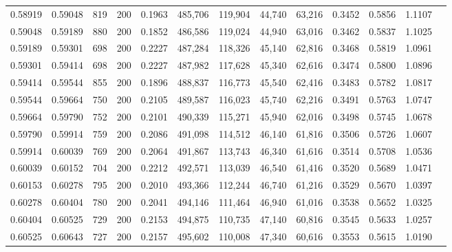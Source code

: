 \begin{tabular}{rrrrrrrrrrrrr}
0.58919 & 0.59048 &    819 & 200 &                                     0.1963 & 485,706 & 119,904 &  44,740 &  63,216 & 0.3452 & 0.5856 & 1.1107 \\
0.59048 & 0.59189 &    880 & 200 &                                     0.1852 & 486,586 & 119,024 &  44,940 &  63,016 & 0.3462 & 0.5837 & 1.1025 \\
0.59189 & 0.59301 &    698 & 200 &                                     0.2227 & 487,284 & 118,326 &  45,140 &  62,816 & 0.3468 & 0.5819 & 1.0961 \\
0.59301 & 0.59414 &    698 & 200 &                                     0.2227 & 487,982 & 117,628 &  45,340 &  62,616 & 0.3474 & 0.5800 & 1.0896 \\
0.59414 & 0.59544 &    855 & 200 &                                     0.1896 & 488,837 & 116,773 &  45,540 &  62,416 & 0.3483 & 0.5782 & 1.0817 \\
0.59544 & 0.59664 &    750 & 200 &                                     0.2105 & 489,587 & 116,023 &  45,740 &  62,216 & 0.3491 & 0.5763 & 1.0747 \\
0.59664 & 0.59790 &    752 & 200 &                                     0.2101 & 490,339 & 115,271 &  45,940 &  62,016 & 0.3498 & 0.5745 & 1.0678 \\
0.59790 & 0.59914 &    759 & 200 &                                     0.2086 & 491,098 & 114,512 &  46,140 &  61,816 & 0.3506 & 0.5726 & 1.0607 \\
0.59914 & 0.60039 &    769 & 200 &                                     0.2064 & 491,867 & 113,743 &  46,340 &  61,616 & 0.3514 & 0.5708 & 1.0536 \\
0.60039 & 0.60152 &    704 & 200 &                                     0.2212 & 492,571 & 113,039 &  46,540 &  61,416 & 0.3520 & 0.5689 & 1.0471 \\
0.60153 & 0.60278 &    795 & 200 &                                     0.2010 & 493,366 & 112,244 &  46,740 &  61,216 & 0.3529 & 0.5670 & 1.0397 \\
0.60278 & 0.60404 &    780 & 200 &                                     0.2041 & 494,146 & 111,464 &  46,940 &  61,016 & 0.3538 & 0.5652 & 1.0325 \\
0.60404 & 0.60525 &    729 & 200 &                                     0.2153 & 494,875 & 110,735 &  47,140 &  60,816 & 0.3545 & 0.5633 & 1.0257 \\
0.60525 & 0.60643 &    727 & 200 &                                     0.2157 & 495,602 & 110,008 &  47,340 &  60,616 & 0.3553 & 0.5615 & 1.0190 \\

\end{tabular}
